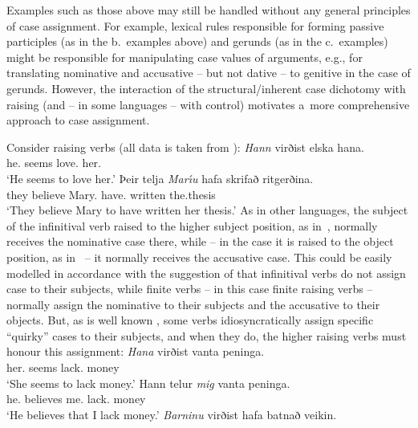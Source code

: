 \documentclass[output=paper
	        ,collection
	        ,collectionchapter
 	        ,biblatex
                ,babelshorthands
                ,newtxmath
                ,draftmode
                ,colorlinks, citecolor=brown
]{langscibook}
\begin{document}
Examples such as those above may still be handled without any general principles of case assignment.  For example, lexical rules \citep[209–218]{ps} responsible for forming passive participles (as in the b.~examples above) and gerunds (as in the c.~examples) might be responsible for manipulating case values of arguments, e.g., for translating nominative and accusative – but not dative – to genitive in the case of gerunds.  However, the interaction of the structural/inherent case dichotomy with raising (and – in some languages – with control) motivates a~more comprehensive approach to case assignment.

Consider  raising verbs (all  data is taken from \citealt[304–305]{SKG92}):
\eal
\label{isl:nom}
\ex
\gll \emph{Hann} virðist elska hana. \\
     he.\NOM{} seems love.\INF{} her.\ACC{}\\
\glt `He seems to love her.'
\ex
\gll Þeir telja \emph{Mar{\'\i}u} hafa skrifað ritgerðina. \\
     they believe Mary.\ACC{} have.\INF{} written the.thesis\\
\glt `They believe Mary to have written her thesis.'
\zl
As in other languages, the subject of the infinitival verb raised to the higher subject position, as in~, normally receives the nominative case there, while – in the case it is raised to the object position, as in~ – it normally receives the accusative case.  This could be easily modelled in accordance with the suggestion of \citet[30]{ps2} that infinitival verbs do not assign case to their subjects, while finite verbs – in this case finite raising verbs – normally assign the nominative to their subjects and the accusative to their objects.  But, as is well known \citep{Andrews82a-u-kopiert,zae:mal:83,ZMT85a}, some  verbs idiosyncratically assign specific “quirky” cases to their subjects, and when they do, the higher raising verbs must honour this assignment:
\eal\label{isl:acc}
\ex
\gll \emph{Hana} virðist vanta peninga. \\
      her.\ACC{} seems lack.\INF{} money\\
\glt `She seems to lack money.'
\ex
\gll Hann telur \emph{mig} vanta peninga. \\
      he.\NOM{} believes me.\ACC{} lack.\INF{} money\\
\glt `He believes that I lack money.'
\zl
\eal
\label{isl:dat}
\ex
\gll  \emph{Barninu} virðist hafa batnað veikin. \\
\end{document}
